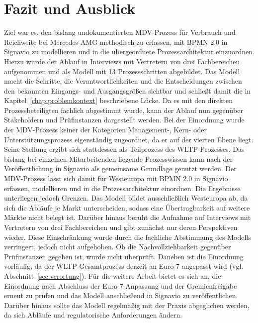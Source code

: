 \chapter{Fazit und Ausblick}
\label{chap:fazit}

Ziel war es, den bislang undokumentierten MDV-Prozess für Verbrauch und Reichweite bei Mercedes-AMG methodisch zu erfassen, mit BPMN 2.0 in Signavio zu modellieren und in die übergeordnete Prozessarchitektur einzuordnen. Hierzu wurde der Ablauf in Interviews mit Vertretern von drei Fachbereichen aufgenommen und als Modell mit 13 Prozessschritten abgebildet. Das Modell macht die Schritte, die Verantwortlichkeiten und die Entscheidungen zwischen den bekannten Eingangs- und Ausgangsgrößen sichtbar und schließt damit die in Kapitel~\ref{chap:problemkontext} beschriebene Lücke. Da es mit den direkten Prozessbeteiligten fachlich abgestimmt wurde, kann der Ablauf nun gegenüber Stakeholdern und Prüfinstanzen dargestellt werden. Bei der Einordnung wurde der MDV-Prozess keiner der Kategorien Management-, Kern- oder Unterstützungsprozess eigenständig zugeordnet, da er auf der vierten Ebene liegt. Seine Stellung ergibt sich stattdessen als Teilprozess des WLTP-Prozesses. Das bislang bei einzelnen Mitarbeitenden liegende Prozesswissen kann nach der Veröffentlichung in Signavio als gemeinsame Grundlage genutzt werden. Der MDV-Prozess lässt sich damit für Westeuropa mit BPMN 2.0 in Signavio erfassen, modellieren und in die Prozessarchitektur einordnen.
\newline
Die Ergebnisse unterliegen jedoch Grenzen. Das Modell bildet ausschließlich Westeuropa ab, da sich die Abläufe je Markt unterscheiden, sodass eine Übertragbarkeit auf weitere Märkte nicht belegt ist. Darüber hinaus beruht die Aufnahme auf Interviews mit Vertretern von drei Fachbereichen und gibt zunächst nur deren Perspektiven wieder. Diese Einschränkung wurde durch die fachliche Abstimmung des Modells verringert, jedoch nicht aufgehoben. Ob die Nachvollziehbarkeit gegenüber Prüfinstanzen gegeben ist, wurde nicht überprüft. Daneben ist die Einordnung vorläufig, da der WLTP-Gesamtprozess derzeit an Euro 7 angepasst wird (vgl. Abschnitt~\ref{sec:verortung}). Für die weitere Arbeit bietet es sich an, die Einordnung nach Abschluss der Euro-7-Anpassung und der Gremienfreigabe erneut zu prüfen und das Modell anschließend in Signavio zu veröffentlichen. Darüber hinaus sollte das Modell regelmäßig mit der Praxis abgeglichen werden, da sich Abläufe und regulatorische Anforderungen ändern.